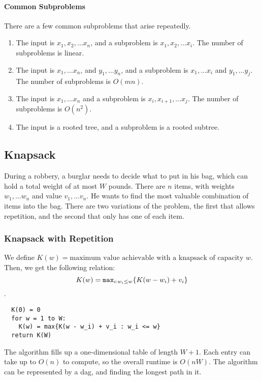 \paragraph{Common Subproblems}
There are a few common subproblems that arise repeatedly.
\begin{enumerate}
  \item The input is $x_1, x_2,\ldots x_n$, and a subproblem is $x_1, x_2,\ldots x_i$.
    The number of subproblems is linear.
  \item The input is $x_1,\ldots x_n$, and $y_1,\ldots y_n$, and a subproblem is $x_1,\ldots x_i$ and $y_1,\ldots y_j$.
    The number of subproblems is $O(mn)$.
  \item The input is $x_1,\ldots x_n$ and a subproblem is $x_i, x_{i+1},\ldots x_j$.
    The number of subproblems is $O(n^2)$.
  \item The input is a rooted tree, and a subproblem is a rooted subtree.
\end{enumerate}

\subsection{Knapsack}
During a robbery, a burglar needs to decide what to put in his bag, which can hold a total weight of at most $W$ pounds.
There are $n$ items, with weights $w_1,\ldots w_n$ and value $v_1,\ldots v_n$.
He wants to find the most valuable combination of items into the bag.
There are two variations of the problem, the first that allows repetition, and the second that only has one of each item.

\subsubsection{Knapsack with Repetition}
We define $K(w) = \text{maximum value achievable with a knapsack of capacity $w$}$.
Then, we get the following relation: $$K(w) = \verb|max|_{i: w_i \leq w} \{K(w - w_i) + v_i\}$$.
\begin{verbatim}
  K(0) = 0
  for w = 1 to W:
    K(w) = max{K(w - w_i) + v_i : w_i <= w}
  return K(W)
\end{verbatim}
The algorithm fills up a one-dimensional table of length $W + 1$.
Each entry can take up to $O(n)$ to compute, so the overall runtime is $O(nW)$.
The algorithm can be represented by a dag, and finding the longest path in it.

